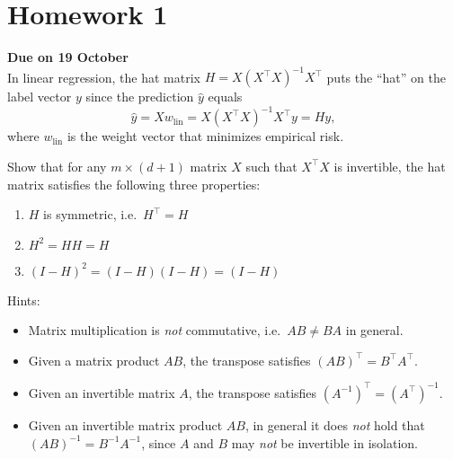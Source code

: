 \documentclass{article}
\begin{document}
  \section*{Homework 1}

  {\bf Due on 19 October}\\

  In linear regression, the hat matrix $H=X(X^\top X)^{-1}X^\top$ puts the ``hat'' on the label vector $y$ since the prediction $\hat{y}$ equals
  \[
	\hat{y} = Xw_{\mathrm{lin}} = X(X^\top X)^{-1}X^\top y = H y,
  \]
  where $w_{\mathrm{lin}}$ is the weight vector that minimizes empirical risk.

  Show that for any $m\times(d+1)$ matrix $X$ such that $X^\top X$ is invertible, the hat matrix satisfies the following three properties:
  \begin{enumerate}
  \item $H$ is symmetric, i.e.~$H^\top = H$
  \item $H^2 = HH = H$
  \item $(I-H)^2 = (I-H)(I-H) = (I-H)$
  \end{enumerate}

  \vspace*{.5cm}

  Hints:
  \begin{itemize}
  \item Matrix multiplication is {\em not} commutative, i.e.~$AB\neq BA$ in general.
  \item Given a matrix product $AB$, the transpose satisfies $(AB)^\top = B^\top A^\top$.
  \item Given an invertible matrix $A$, the transpose satisfies $\left(A^{-1}\right)^\top = \left(A^\top\right)^{-1}$.
  \item Given an invertible matrix product $AB$, in general it does {\em not} hold that $(AB)^{-1} = B^{-1} A^{-1}$, since $A$ and $B$ may {\em not} be invertible in isolation.
  \end{itemize}
\end{document}
